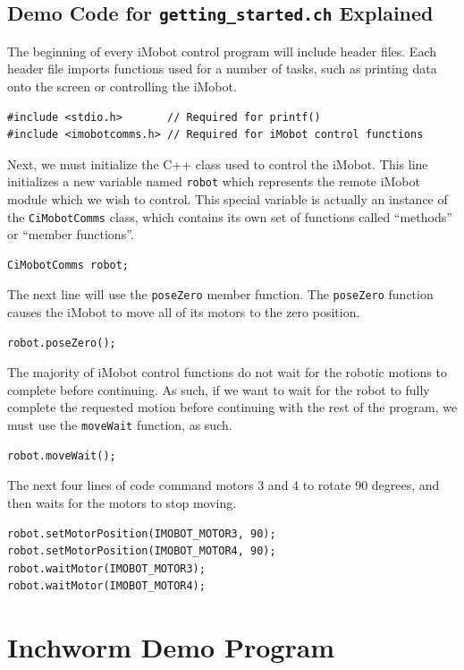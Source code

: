 \documentclass[11pt]{report}
\begin{document}
\subsection{\label{sec:democode}Demo Code for \texttt{getting\_started.ch} Explained}
The beginning of every iMobot control program will include header files. Each
header file imports functions used for a number of tasks, such as printing
data onto the screen or controlling the iMobot. 

\begin{verbatim}
#include <stdio.h>       // Required for printf()
#include <imobotcomms.h> // Required for iMobot control functions
\end{verbatim}

Next, we must initialize the C++ class used to control the iMobot. This line
initializes a new variable named \texttt{robot} which represents the remote
iMobot module which we wish to control. This special variable is actually an
instance of the \texttt{CiMobotComms} class, which contains its own set of
functions called ``methods'' or ``member functions''.
\begin{verbatim}
CiMobotComms robot;
\end{verbatim}

The next line will use the \texttt{poseZero} member function. The
\texttt{poseZero} function causes the iMobot to move all of its motors to the
zero position.
\begin{verbatim}
robot.poseZero();
\end{verbatim}

The majority of iMobot control functions do not wait for the robotic motions to
complete before continuing. As such, if we want to wait for the robot to fully
complete the requested motion before continuing with the rest of the program,
we must use the \texttt{moveWait} function, as such.
\begin{verbatim}
robot.moveWait();
\end{verbatim}

The next four lines of code command motors 3 and 4 to rotate 90 degrees, and
then waits for the motors to stop moving.
\begin{verbatim}
robot.setMotorPosition(IMOBOT_MOTOR3, 90);
robot.setMotorPosition(IMOBOT_MOTOR4, 90);
robot.waitMotor(IMOBOT_MOTOR3);
robot.waitMotor(IMOBOT_MOTOR4);
\end{verbatim}

\section{Inchworm Demo Program}
\end{document}
